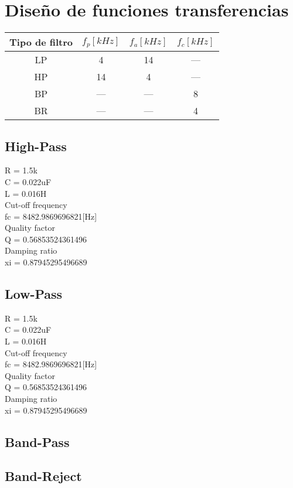 \section{Dise\~no de funciones transferencias}\begin{tabular}{|c|c|c|c|}
\hline 
Tipo de filtro & $f_p[kHz]$ & $f_a[kHz]$ & $f_c[kHz]$ \\ 
\hline 
LP & 4   & 14  & --- \\ 
\hline 
HP & 14  & 4   & --- \\ 
\hline 
BP & --- & --- & 8   \\ 
\hline 
BR & --- & --- & 4   \\ 
\hline 
\end{tabular} 



\subsection{High-Pass}

R = 1.5k	\\
C = 0.022uF	\\
L = 0.016H	\\
Cut-off frequency	\\
fc = 8482.9869696821[Hz]	\\
Quality factor	\\
Q = 0.56853524361496	\\
Damping ratio	\\
xi = 0.87945295496689	\\

\subsection{Low-Pass}

R = 1.5k \\
C = 0.022uF \\
L = 0.016H \\
Cut-off frequency \\
fc = 8482.9869696821[Hz] \\
Quality factor \\
Q = 0.56853524361496 \\
Damping ratio \\
xi = 0.87945295496689 \\

\subsection{Band-Pass}

\subsection{Band-Reject}